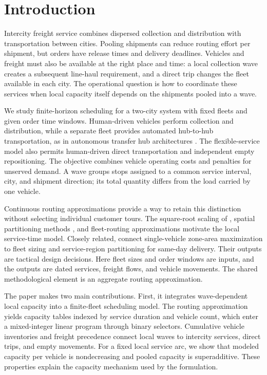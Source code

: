 \section{Introduction}
\label{sec:introduction}

Intercity freight service combines dispersed collection and distribution with transportation between cities. Pooling shipments can reduce routing effort per shipment, but orders have release times and delivery deadlines. Vehicles and freight must also be available at the right place and time: a local collection wave creates a subsequent line-haul requirement, and a direct trip changes the fleet available in each city. The operational question is how to coordinate these services when local capacity itself depends on the shipments pooled into a wave.

We study finite-horizon scheduling for a two-city system with fixed fleets and given order time windows. Human-driven vehicles perform collection and distribution, while a separate fleet provides automated hub-to-hub transportation, as in autonomous transfer hub architectures \citep{Lee2024}. The flexible-service model also permits human-driven direct transportation and independent empty repositioning. The objective combines vehicle operating costs and penalties for unserved demand. A wave groups stops assigned to a common service interval, city, and shipment direction; its total quantity differs from the load carried by one vehicle.

Continuous routing approximations provide a way to retain this distinction without selecting individual customer tours. The square-root scaling of \citet{Beardwood1959}, spatial partitioning methods \citep{Karp1977}, and fleet-routing approximations \citep{Daganzo1984} motivate the local service-time model. Closely related, \citet{Banerjee2022} connect single-vehicle zone-area maximization to fleet sizing and service-region partitioning for same-day delivery. Their outputs are tactical design decisions. Here fleet sizes and order windows are inputs, and the outputs are dated services, freight flows, and vehicle movements. The shared methodological element is an aggregate routing approximation.

The paper makes two main contributions. First, it integrates wave-dependent local capacity into a finite-fleet scheduling model. The routing approximation yields capacity tables indexed by service duration and vehicle count, which enter a mixed-integer linear program through binary selectors. Cumulative vehicle inventories and freight precedence connect local waves to intercity services, direct trips, and empty movements. For a fixed local service arc, we show that modeled capacity per vehicle is nondecreasing and pooled capacity is superadditive. These properties explain the capacity mechanism used by the formulation.

